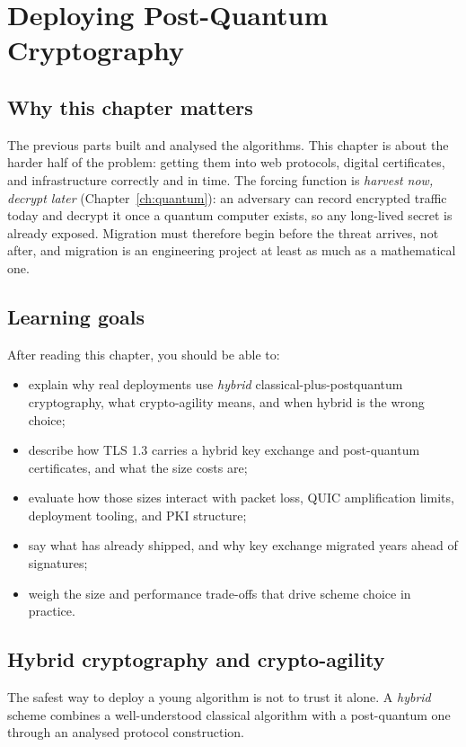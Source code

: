 \chapter{Deploying Post-Quantum Cryptography}
\label{ch:applications}

\section{Why this chapter matters}
The previous parts built and analysed the algorithms. This chapter is about the harder half of the problem: getting them into web protocols, digital certificates, and infrastructure correctly and in time. The forcing function is \emph{harvest now, decrypt later} (Chapter~\ref{ch:quantum}): an adversary can record encrypted traffic today and decrypt it once a quantum computer exists, so any long-lived secret is already exposed. Migration must therefore begin before the threat arrives, not after, and migration is an engineering project at least as much as a mathematical one.

\section{Learning goals}
After reading this chapter, you should be able to:

\begin{itemize}
  \item explain why real deployments use \emph{hybrid} classical-plus-postquantum cryptography, what crypto-agility means, and when hybrid is the wrong choice;
  \item describe how TLS 1.3 carries a hybrid key exchange and post-quantum certificates, and what the size costs are;
  \item evaluate how those sizes interact with packet loss, QUIC amplification limits, deployment tooling, and PKI structure;
  \item say what has already shipped, and why key exchange migrated years ahead of signatures;
  \item weigh the size and performance trade-offs that drive scheme choice in practice.
\end{itemize}

\section{Hybrid cryptography and crypto-agility}
The safest way to deploy a young algorithm is not to trust it alone. A \emph{hybrid} scheme combines a well-understood classical algorithm with a post-quantum one through an analysed protocol construction.

